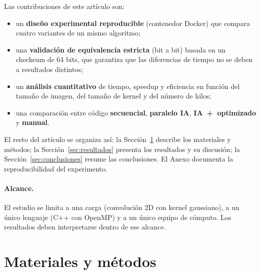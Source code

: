 \documentclass[12pt]{article}
\begin{document}
Las contribuciones de este artículo son:
\begin{itemize}[leftmargin=1.4em,itemsep=1pt]
  \item un \textbf{diseño experimental reproducible} (contenedor Docker) que
        compara cuatro variantes de un mismo algoritmo;
  \item una \textbf{validación de equivalencia estricta} (bit a bit) basada en un
        checksum de 64 bits, que garantiza que las diferencias de tiempo no se
        deben a resultados distintos;
  \item un \textbf{análisis cuantitativo} de tiempo, speedup y eficiencia en
        función del tamaño de imagen, del tamaño de kernel y del número de hilos;
  \item una comparación entre código \textbf{secuencial}, \textbf{paralelo IA},
        \textbf{IA~+~optimizado} y \textbf{manual}.
\end{itemize}

El resto del artículo se organiza así: la Sección~\ref{sec:metodos} describe los
materiales y métodos; la Sección~\ref{sec:resultados} presenta los resultados y su
discusión; la Sección~\ref{sec:conclusiones} resume las conclusiones. El Anexo
documenta la reproducibilidad del experimento.

\paragraph{Alcance.} El estudio se limita a una carga (convolución 2D con kernel
gaussiano), a un único lenguaje (C++ con OpenMP) y a un único equipo de cómputo.
Los resultados deben interpretarse dentro de ese alcance.

\section{Materiales y métodos}
\label{sec:metodos}
\end{document}
